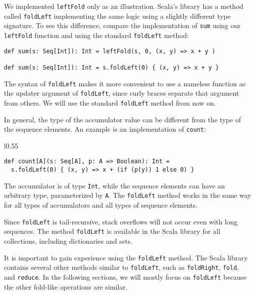 We implemented \lstinline!leftFold! only as an illustration. Scala\textsf{'}s
library has a method called \lstinline!foldLeft! implementing the
same logic using a slightly different type signature. To see this
difference, compare the implementation of \lstinline!sum! using our
\lstinline!leftFold! function and using the standard \lstinline!foldLeft!
method:
\begin{lstlisting}
def sum(s: Seq[Int]): Int = leftFold(s, 0, (x, y) => x + y )

def sum(s: Seq[Int]): Int = s.foldLeft(0) { (x, y) => x + y }
\end{lstlisting}
The syntax of \lstinline!foldLeft! makes it more convenient to use
a nameless function as the updater argument of \lstinline!foldLeft!,
since curly braces separate that argument from others. We will use
the standard \lstinline!foldLeft! method from now on.

In general, the type of the accumulator value can be different from
the type of the sequence elements. An example is an implementation
of \lstinline!count!:

\begin{wrapfigure}{l}{0.55\columnwidth}%
\vspace{-0.75\baselineskip}
\begin{lstlisting}
def count[A](s: Seq[A], p: A => Boolean): Int =
  s.foldLeft(0) { (x, y) => x + (if (p(y)) 1 else 0) }
\end{lstlisting}

\vspace{-0.9\baselineskip}
\end{wrapfigure}%

\noindent The accumulator is of type \lstinline!Int!, while the sequence
elements can have an arbitrary type, parameterized by \lstinline!A!.
The \lstinline!foldLeft! method works in the same way for all types
of accumulators and all types of sequence elements.

Since \lstinline!foldLeft! is tail-recursive, stack overflows will
not occur even with long sequences. The method \lstinline!foldLeft!
is available in the Scala library for all collections, including dictionaries
and sets.

It is important to gain experience using the \lstinline!foldLeft!
method. The Scala library contains several other methods similar to
\lstinline!foldLeft!, such as \lstinline!foldRight!, \lstinline!fold!,
and \lstinline!reduce!. In the following sections, we will mostly
focus on \lstinline!foldLeft! because the other fold-like operations
are similar.

